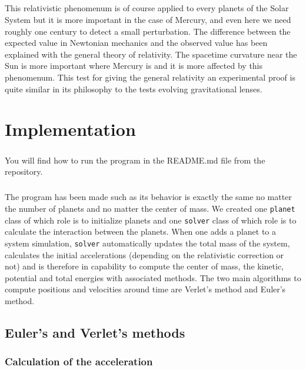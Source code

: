 \documentclass[a4paper, twoside, 11pt]{report}
\theoremstyle{theorem}
\theoremstyle{remark}
\theoremstyle{exemple}
\begin{document}
               \paragraph{}This relativistic phenomenum is of course applied to every planets of the Solar System but it is more important in the case of Mercury, and even here we need roughly one century to detect a small perturbation. The difference between the expected value in Newtonian mechanics and the observed value has been explained with the general theory of relativity. The spacetime curvature near the Sun is more important where Mercury is and it is more affected by this phenomenum. This test for giving the general relativity an experimental proof is quite similar in its philosophy to the tests evolving gravitational lenses.


\chapter{Implementation}

	\paragraph{}You will find how to run the program in the README.md file from the repository.

    \paragraph{}The program has been made such as its behavior is exactly the same no matter the number of planets and no matter the center of mass. We created one \texttt{planet} class of which role is to initialize planets and one \texttt{solver} class of which role is to calculate the interaction between the planets. When one adds a planet to a system simulation, \texttt{solver} automatically updates the total mass of the system, calculates the initial accelerations (depending on the relativistic correction or not) and is therefore in capability to compute the center of mass, the kinetic, potential and total energies with associated methods. The two main algorithms to compute positions and velocities around time are Verlet's method and Euler's method.
		
		\section{Euler's and Verlet's methods}
		
			\subsection{Calculation of the acceleration}
			
\end{document}
